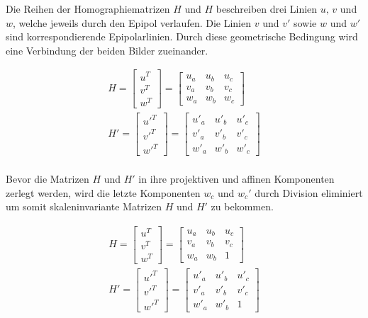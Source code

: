Die Reihen der Homographiematrizen $H$ und $H$ beschreiben drei Linien $u, \, v$ und $w$, welche jeweils durch den Epipol verlaufen. Die Linien $v$ und $v'$ sowie $w$ und $w'$ sind korrespondierende Epipolarlinien. Durch diese geometrische Bedingung wird eine Verbindung der beiden Bilder zueinander. 

\begin{gather}
	H = \begin{bmatrix}
		u^T\\v^T\\w^T
	\end{bmatrix} =
	\begin{bmatrix}
		u_a&u_b&u_c\\
		v_a&v_b&v_c\\
		w_a&w_b&w_c
	\end{bmatrix}\\
	H' = \begin{bmatrix}
		u'^T\\v'^T\\w'^T
	\end{bmatrix} =
	\begin{bmatrix}
		u'_a&u'_b&u'_c\\
		v'_a&v'_b&v'_c\\
		w'_a&w'_b&w'_c
	\end{bmatrix}	
\end{gather}\\

Bevor die Matrizen $H$ und $H'$ in ihre projektiven und affinen Komponenten zerlegt werden, wird die letzte Komponenten $w_c$ und $w_c'$ durch Division eliminiert um somit skaleninvariante Matrizen $H$ und $H'$ zu bekommen\cite{ZZ,phdextrinsicPara}. 
%

\begin{gather}
	H = \begin{bmatrix}
		u^T\\v^T\\w^T
	\end{bmatrix} =
	\begin{bmatrix}
		u_a&u_b&u_c\\
		v_a&v_b&v_c\\
		w_a&w_b&1
	\end{bmatrix}\\
	H' = \begin{bmatrix}
		u'^T\\v'^T\\w'^T
	\end{bmatrix} =
	\begin{bmatrix}
		u'_a&u'_b&u'_c\\
		v'_a&v'_b&v'_c\\
		w'_a&w'_b&1
	\end{bmatrix}	
\end{gather}\\


